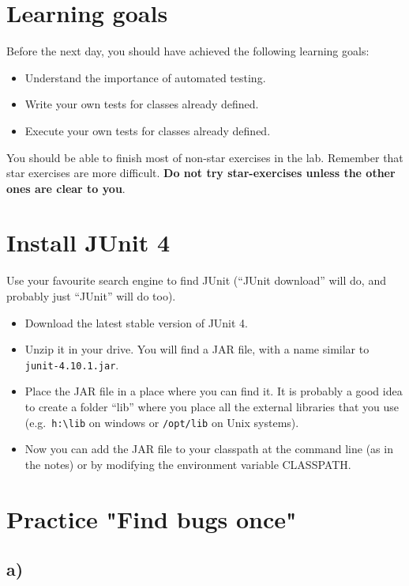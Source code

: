 \documentclass{article}
\begin{document}
\section*{Learning goals}
\label{sec:learning-goals}

Before the next day, you should have achieved the following learning
goals: 

\begin{itemize}
\item Understand the importance of automated testing. 
\item Write your own tests for classes already defined. 
\item Execute your own tests for classes already defined. 
\end{itemize}

You should be able to finish most of non-star exercises in the lab. 
Remember that star exercises are more difficult. 
\textbf{Do not try star-exercises unless the other ones are clear to
  you}.  


\section{Install JUnit 4}
\label{sec:install-junit-4}

Use your favourite search engine to find JUnit (``JUnit download''
will do, and probably just ``JUnit'' will do too). 

\begin{itemize}
\item Download the latest stable version of JUnit 4.
\item Unzip it in your drive. You will find a JAR file, with a name
  similar to \verb+junit-4.10.1.jar+.
\item Place the JAR file in a place where you can find it. It is
  probably a good idea to create a folder ``lib'' where you place all
  the external libraries that you use (e.g.~\verb+h:\lib+ on windows
  or \verb+/opt/lib+ on Unix systems).
\item Now you can add the JAR file to your classpath at the command
  line (as in the notes) or by modifying the environment variable
  CLASSPATH. 
\end{itemize}

\section{Practice "Find bugs once"}
\label{sec:practice-find-bugs}

\subsection*{a)}
\end{document}
